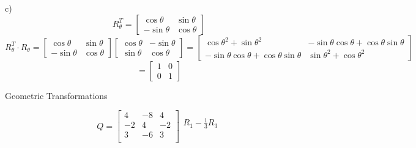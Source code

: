 \documentclass[12pt]{article}
\newcommand{\sqbrl}{\left[}
\newcommand{\sqbrr}{\right]}
\newenvironment{problem}[2][Problem]{\begin{trivlist}
\item[\hskip \labelsep {\bfseries #1}\hskip \labelsep {\bfseries #2.}]}{\end{trivlist}}
\begin{document}
c)\\
	\[R_{\theta}^T = \sqbrl\begin{matrix}\cos{\theta} & \sin{\theta}\\-\sin{\theta} & \cos{\theta}\end{matrix}\sqbrr\]
	\[R_{\theta}^T\cdot{R_{\theta}}  
	= \sqbrl\begin{matrix}\cos{\theta} & \sin{\theta}\\-\sin{\theta} & \cos{\theta}\end{matrix}\sqbrr\sqbrl\begin{matrix}	\cos{\theta} & -\sin{\theta}\\\sin{\theta} & \cos{\theta}\end{matrix}\sqbrr
	= \sqbrl\begin{matrix}\cos{\theta}^2 + \sin{\theta}^2 & -\sin{\theta}\cos{\theta} + \cos{\theta}\sin{\theta}\\
		-\sin{\theta}\cos{\theta} + \cos{\theta}\sin{\theta} & \sin{\theta}^2 + \cos{\theta}^2\end{matrix}\sqbrr\]
	\[=\sqbrl\begin{matrix}1 & 0\\ 0 & 1\end{matrix}\sqbrr\]

\begin{problem}{8}
	Geometric Transformations
\end{problem}
	\[Q = \sqbrl\begin{matrix}4 & -8 & 4\\
							-2 & 4 & -2\\
							3 & -6 & 3\\
			     \end{matrix}\sqbrr\begin{matrix}R_1 - \frac{1}{3}R_3\\\\\end{matrix}\]
			     
\end{document}
